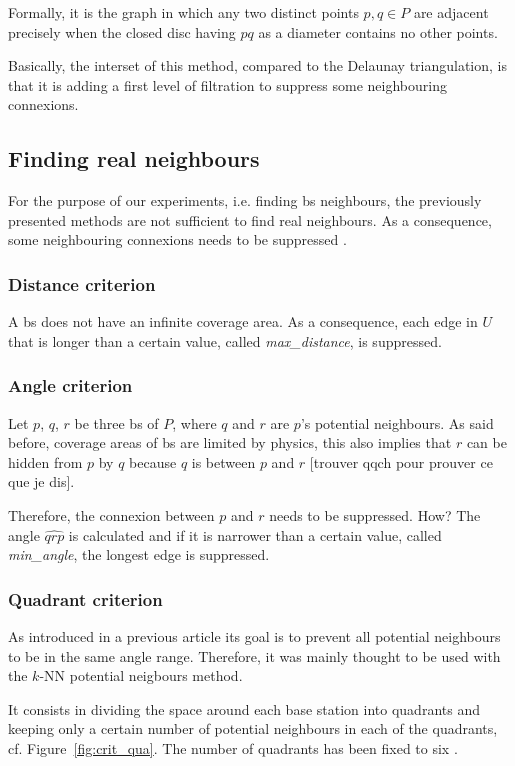 \documentclass[lettersize,journal,english]{IEEEtran}
\begin{document}
Formally, it is the graph in which any two distinct points $p, q \in P$ are adjacent precisely when the closed disc having $pq$ as a diameter contains no other points.

Basically, the interset of this method, compared to the Delaunay triangulation, is that it is adding a first level of filtration to suppress some neighbouring connexions.

\subsection{Finding real neighbours}
For the purpose of our experiments, i.e. finding \acrshort{bs} neighbours, the previously presented methods are not sufficient to find real neighbours.
As a consequence, some neighbouring connexions needs to be suppressed \cite{patent_neighs}.
\subsubsection{Distance criterion\cite{patent_neighs}}
A \acrshort{bs} does not have an infinite coverage area.
As a consequence, each edge in $U$ that is longer than a certain value, called \emph{max\_distance}, is suppressed.

\subsubsection{Angle criterion}
Let $p$, $q$, $r$ be three \acrshort{bs} of $P$, where $q$ and $r$ are $p$'s potential neighbours. As said before, coverage areas of \acrshort{bs} are limited by physics, this also implies that $r$ can be \og hidden\fg{} from $p$ by $q$ because $q$ is between $p$ and $r$ [trouver qqch pour prouver ce que je dis].

Therefore, the connexion between $p$ and $r$ needs to be suppressed. How? The angle $\widehat{qrp}$ is calculated and if it is narrower than a certain value, called \emph{min\_angle}, the longest edge is suppressed.

\subsubsection{Quadrant criterion}
As introduced in a previous article \cite{10201211} its goal is to prevent all potential neighbours to be in the same angle range. Therefore, it was mainly thought to be used with the 
$k$-NN potential neigbours method.

It consists in dividing the space around each base station into quadrants and keeping only a certain number of potential neighbours
in each of the quadrants, cf. Figure~\ref{fig:crit_qua}.
The number of quadrants has been fixed to six \cite{art_del_paq}.
\end{document}
